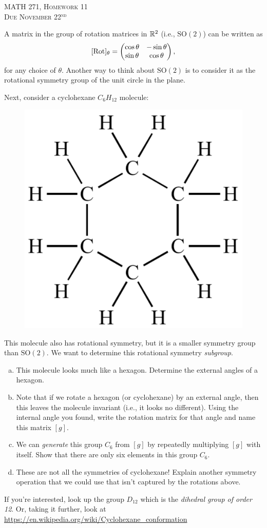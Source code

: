 \documentclass[12pt]{article} %
\begin{document}
\begin{center}
   \textsc{\large MATH 271, Homework 11}\\
   \textsc{Due November 22$^\textrm{nd}$}
\end{center}
\vspace{.5cm}

\begin{problem}
A matrix in the group of rotation matrices in $\mathbb{R}^2$ (i.e., $\mathrm{SO}(2)$) can be written as
\[
[\mathrm{Rot}]_\theta = \begin{pmatrix} \cos \theta & - \sin \theta \\ \sin \theta & \cos \theta \end{pmatrix},
\]
for any choice of $\theta$. Another way to think about $\mathrm{SO}(2)$ is to consider it as the rotational symmetry group of the unit circle in the plane.

Next, consider a cyclohexane $C_6H_{12}$ molecule:
    \begin{figure}[H]
        \centering
        \includegraphics[width=.3\textwidth]{cyclohexane-500x500.png}
    \end{figure}
    \noindent This molecule also has rotational symmetry, but it is a smaller symmetry group than $\mathrm{SO}(2)$. We want to determine this rotational symmetry \emph{subgroup}.
\begin{enumerate}[(a)]
    \item This molecule looks much like a hexagon. Determine the external angles of a hexagon.
    \item Note that if we rotate a hexagon (or cyclohexane) by an external angle, then this leaves the molecule invariant (i.e., it looks no different). Using the internal angle you found, write the rotation matrix for that angle and name this matrix $[g]$.
    \item We can \emph{generate} this group $C_6$ from $[g]$ by repeatedly multiplying $[g]$ with itself.  Show that there are only six elements in this group $C_6$.
    \item These are not all the symmetries of cyclohexane! Explain another symmetry operation that we could use that isn't captured by the rotations above.
\end{enumerate}
If you're interested, look up the group $D_{12}$ which is the \emph{dihedral group of order 12}. Or, taking it further, look at \url{https://en.wikipedia.org/wiki/Cyclohexane_conformation}
\end{problem}
\end{document}
